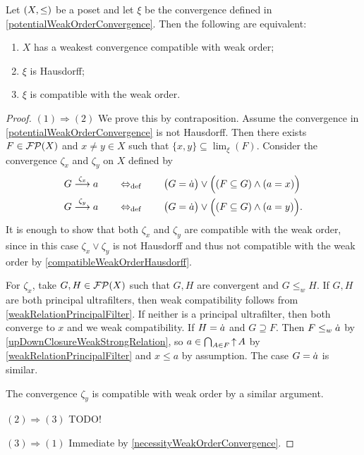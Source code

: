 \begin{proposition}
Let $\sSet{X,\leq}$ be a poset and let $\xi$ be the convergence defined in \ref{potentialWeakOrderConvergence}. Then the following are equivalent:
\begin{enumerate}
\item $X$ has a weakest convergence compatible with weak order;
\item $\xi$ is Hausdorff;
\item $\xi$ is compatible with the weak order.
\end{enumerate}
\end{proposition}
\begin{proof}
$(1) \Rightarrow (2)$ We prove this by contraposition. Assume the convergence in \ref{potentialWeakOrderConvergence} is not Hausdorff. Then there exists $F\in \operatorname{\mathcal{FP}}(X)$ and $x\neq y \in X$ such that $\{x,y\}\subseteq \lim_\xi(F)$. Consider the convergence $\zeta_x$ and $\zeta_y$ on $X$ defined by
\begin{align*}
G\overset{\zeta_x}{\longrightarrow} a \quad&\quad\Leftrightarrow_{\text{def}}\quad\quad \big(G = \dot{a}\big) \lor \Big( (F\subseteq G)\land (a = x) \Big) \\
G\overset{\zeta_y}{\longrightarrow} a \quad&\quad\Leftrightarrow_{\text{def}}\quad\quad \big(G = \dot{a}\big) \lor \Big( (F\subseteq G)\land (a = y) \Big).
\end{align*}
It is enough to show that both $\zeta_x$ and $\zeta_y$ are compatible with the weak order, since in this case $\zeta_x \vee \zeta_y$ is not Hausdorff and thus not compatible with the weak order by \ref{compatibleWeakOrderHausdorff}.

For $\zeta_x$, take $G, H\in \operatorname{\mathcal{FP}}(X)$ such that $G,H$ are convergent and $G\leq_w H$. If $G,H$ are both principal ultrafilters, then weak compatibility follows from \ref{weakRelationPrincipalFilter}. If neither is a principal ultrafilter, then both converge to $x$ and we weak compatibility.
If $H = \dot{a}$ and $G\supseteq F$. Then $F\leq_w \dot{a}$ by \ref{upDownClosureWeakStrongRelation}, so $a \in \bigcap_{A\in F}\operatorname{\uparrow} A$ by \ref{weakRelationPrincipalFilter} and $x\leq a$ by assumption. The case $G = \dot{a}$ is similar.

The convergence $\zeta_y$ is compatible with weak order by a similar argument.

$(2) \Rightarrow (3)$ TODO!

$(3) \Rightarrow (1)$ Immediate by \ref{necessityWeakOrderConvergence}.
\end{proof}


